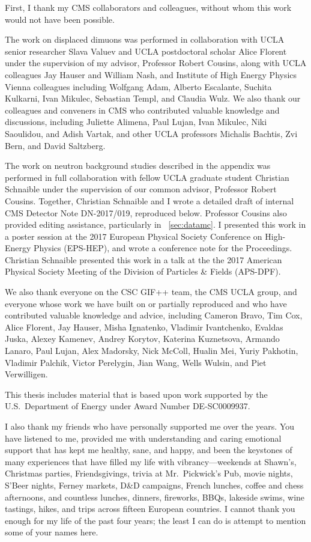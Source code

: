 First, I thank my CMS collaborators and colleagues, without whom this work would not have been possible.

The work on displaced dimuons was performed in collaboration with UCLA senior researcher Slava Valuev and UCLA postdoctoral scholar Alice Florent under the supervision of my advisor, Professor Robert Cousins, along with UCLA colleagues Jay Hauser and William Nash, and Institute of High Energy Physics Vienna colleagues including Wolfgang Adam, Alberto Escalante, Suchita Kulkarni, Ivan Mikulec, Sebastian Templ, and Claudia Wulz.
We also thank our colleagues and conveners in CMS who contributed valuable knowledge and discussions, including Juliette Alimena, Paul Lujan, Ivan Mikulec, Niki Saoulidou, and Adish Vartak, and other UCLA professors Michalis Bachtis, Zvi Bern, and David Saltzberg.

The work on neutron background studies described in the appendix was performed in full collaboration with fellow UCLA graduate student Christian Schnaible under the supervision of our common advisor, Professor Robert Cousins.
Together, Christian Schnaible and I wrote a detailed draft of internal CMS Detector Note DN-2017/019, reproduced below.
Professor Cousins also provided editing assistance, particularly in \Sec~\ref{sec:datamc}.
I presented this work in a poster session at the 2017 European Physical Society Conference on High-Energy Physics (EPS-HEP), and wrote a conference note for the Proceedings.
Christian Schnaible presented this work in a talk at the the 2017 American Physical Society Meeting of the Division of Particles \& Fields (APS-DPF).

We also thank everyone on the CSC GIF++ team, the CMS UCLA group, and everyone whose work we have built on or partially reproduced and who have contributed valuable knowledge and advice, including Cameron Bravo, Tim Cox, Alice Florent, Jay Hauser, Misha Ignatenko, Vladimir Ivantchenko, Evaldas Juska, Alexey Kamenev, Andrey Korytov, Katerina Kuznetsova, Armando Lanaro, Paul Lujan, Alex Madorsky, Nick McColl, Hualin Mei, Yuriy Pakhotin, Vladimir Palchik, Victor Perelygin, Jian Wang, Wells Wulsin, and Piet Verwilligen.

This thesis includes material that is based upon work supported by the U.S.\ Department of Energy under Award Number {DE}-{SC}0009937.

I also thank my friends who have personally supported me over the years.
You have listened to me, provided me with understanding and caring emotional support that has kept me healthy, sane, and happy, and been the keystones of many experiences that have filled my life with vibrancy---weekends at Shawn's, Christmas parties, Friendsgivings, trivia at Mr.\ Pickwick's Pub, movie nights, S'Beer nights, Ferney markets, D\&D campaigns, French lunches, coffee and chess afternoons, and countless lunches, dinners, fireworks, BBQs, lakeside swims, wine tastings, hikes, and trips across fifteen European countries.
I cannot thank you enough for my life of the past four years; the least I can do is attempt to mention some of your names here.

